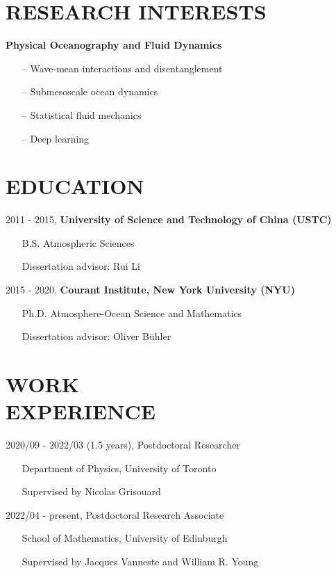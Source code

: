 \documentclass[margin]{res}
\begin{document}
\begin{resume}

\section{{\normalfont RESEARCH INTERESTS}}
\textbf{Physical Oceanography and Fluid Dynamics}
\begin{itemize}[leftmargin=*,noitemsep]
\item[--]{Wave-mean interactions and disentanglement}
\item[--]{Submesoscale ocean dynamics}
\item[--]{Statistical fluid mechanics}
\item[--]{Deep learning}
\end{itemize}

\section{{\normalfont EDUCATION}}
2011 - 2015, \textbf{University of Science and Technology of China (USTC)} 
\begin{itemize}[leftmargin=*,noitemsep]
\item[]{B.S. Atmospheric Sciences}
\item[]{Dissertation advisor: Rui Li}
\end{itemize}
\vspace*{-2.5mm}
2015 - 2020, \textbf{Courant Institute, New York University (NYU)} 
\begin{itemize}[leftmargin=*,noitemsep]
\item[]{Ph.D. Atmosphere-Ocean Science and Mathematics}
\item[]{Dissertation advisor: Oliver B{\"u}hler}
\end{itemize}


\section{{\normalfont WORK \\EXPERIENCE}}
2020/09 - 2022/03 (1.5 years), Postdoctoral Researcher
\begin{itemize}[leftmargin=*,noitemsep]
\item[]{Department of Physics, University of Toronto}
\item[]{Supervised by Nicolas Grisouard}
\end{itemize}
2022/04 - present, Postdoctoral Research Associate
\begin{itemize}[leftmargin=*,noitemsep]
\item[]{School of Mathematics, University of Edinburgh}
\item[]{Supervised by  Jacques Vanneste and William R. Young }
\end{itemize}


\end{resume}
\end{document}
